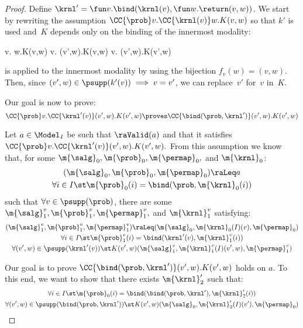 \begin{proof}
  Define $\krnl' = \fun v . \bind(\krnl(v), \fun w . \return(v, w))$.
  We start by rewriting the assumption $\CC{\prob} v.\CC{\krnl(v)} w.K(v,w)$ so that $k'$ is used and~$K$ depends only on the binding of the innermost modality:
  \begin{eqexplain}
    \CC{\prob} v. w.K(v,w)
    \whichproves*
    \CC{\prob} v. (v',w).K(v,w)
    \whichproves
    \CC{\prob} v. (v',w).K(v',w)
  \end{eqexplain}
   is applied to the innermost modality
  by using the bijection $f_v(w) = (v,w)$.
  Then, since $(v',w) \in \psupp(k'(v)) \implies v=v'$,
  we can replace~$v'$ for~$v$ in~$K$.

  Our goal is now to prove:
  \[
    \CC{\prob} v.\CC{\krnl'(v)} (v',w).K(v',w)
    \proves
    \CC{\bind(\prob,\krnl')} (v',w).K(v',w)
  \]

  Let $a\in\Model_I$ be such that $ \raValid(a) $ and that it satisfies
  $ \CC{\prob} v.\CC{\krnl'(v)} (v',w).K(v',w). $
  From this assumption we know that,
  for some $ \m{\salg}_0, \m{\prob}_0,\m{\permap}_0,$ and $ \m{\krnl}_0 $:
  \begin{gather}
    (\m{\salg}_0, \m{\prob}_0,\m{\permap}_0) \raLeq a
    \label{c-assoc:prob0}
    \\
    \forall i\in I\st
      \m{\prob}_0(i) = \bind(\prob, \m{\krnl}_0(i))
    \label{c-assoc:prob0-bind}
  \end{gather}
  such that $\forall v \in \psupp(\prob)$,
  there are some
  $ \m{\salg}_1^v, \m{\prob}_1^v,\m{\permap}_1^v,$ and $ \m{\krnl}_1^v $
  satisfying:
  \begin{gather}
    (\m{\salg}_1^v, \m{\prob}_1^v,\m{\permap}_1^v)
    \raLeq
    (\m{\salg}_0, \m{\krnl}_0(I)(v),\m{\permap}_0)
    \label{c-assoc:prob1}
    \\
    \forall i\in I\st
      \m{\prob}_1^v(i) = \bind(\krnl'(v), \m{\krnl}_1^v(i))
    \label{c-assoc:prob1-bind}
    \\
    \forall (v',w) \in \psupp(\krnl'(v)) \st
      K(v',w)(\m{\salg}_1^v, \m{\krnl}_1^v(I)(v',w), \m{\permap}_1^v)
    \label{c-assoc:K-krnl1}
  \end{gather}

  Our goal is to prove
  $ \CC{\bind(\prob,\krnl')} (v',w).K(v',w) $ holds on $a$.
  To this end, we want to show that
  there exists $\m{\krnl}_2'$ such that:
\begin{gather}
    \forall i\in I\st
      \m{\prob}_0(i) = \bind(\bind(\prob,\krnl'), \m{\krnl}_2'(i))
    \label{c-assoc:goal1}
    \\
    \forall (v',w) \in \psupp(\bind(\prob,\krnl')) \st
      K(v', w)(\m{\salg}_0 , \m{\krnl}_2'(I) (v'), \m{\permap}_0)
    \label{c-assoc:goal2}
  \end{gather}


\end{proof}
